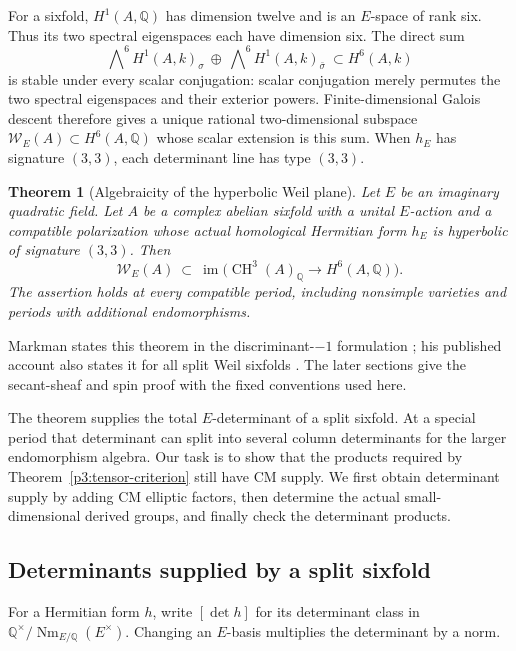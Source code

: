 \documentclass[11pt]{article}
\newcommand{\Q}{\mathbb Q}
\newcommand{\CH}{\operatorname{CH}}
\newtheorem{theorem}{Theorem}[section]
\numberwithin{equation}{section}
\begin{document}
For a sixfold, \(H^1(A,\Q)\) has dimension twelve and is an
\(E\)-space of rank six.  Thus its two spectral eigenspaces each
have dimension six.  The direct sum
\[
 \bigwedge\nolimits^6 H^1(A,k)_\sigma
 \ \oplus\
 \bigwedge\nolimits^6 H^1(A,k)_{\bar\sigma}
 \ \subset H^6(A,k)
\]
is stable under every scalar conjugation: scalar conjugation merely
permutes the two spectral eigenspaces and their exterior powers.
Finite-dimensional Galois descent therefore gives a unique rational
two-dimensional subspace \(\mathcal W_E(A)\subset H^6(A,\Q)\) whose
scalar extension is this sum.  When \(h_E\) has signature \((3,3)\),
each determinant line has type \((3,3)\).

\begin{theorem}[Algebraicity of the hyperbolic Weil plane]
\label{p3sw:weil-plane}
Let \(E\) be an imaginary quadratic field.  Let \(A\) be a complex
abelian sixfold with a unital \(E\)-action and a compatible polarization
whose actual homological Hermitian form \(h_E\) is hyperbolic of signature
\((3,3)\).  Then
\[
 \mathcal W_E(A)\ \subset\
 \operatorname{im}\bigl(\CH^3(A)_\Q
                    \longrightarrow H^6(A,\Q)\bigr).
\]
The assertion holds at every compatible period, including nonsimple
varieties and periods with additional endomorphisms.
\end{theorem}

Markman states this theorem in the discriminant-\(-1\) formulation
\cite[Theorem~1.5.1]{Markman2025Secant}; his published account also
states it for all split Weil sixfolds
\cite[Theorem~1.2]{Markman2026ICM}.  The later sections give the
secant-sheaf and spin proof with the fixed conventions used here.

The theorem supplies the total \(E\)-determinant of a split sixfold.
At a special period that determinant can split into several column
determinants for the larger endomorphism algebra.  Our task is to show
that the products required by Theorem~\ref{p3:tensor-criterion} still
have CM supply.  We first obtain determinant supply by adding CM
elliptic factors, then determine the actual small-dimensional derived
groups, and finally check the determinant products.

\subsection{Determinants supplied by a split sixfold}

For a Hermitian form \(h\), write \([\det h]\) for its determinant
class in \(\Q^\times/\operatorname{Nm}_{E/\Q}(E^\times)\).
Changing an \(E\)-basis multiplies the determinant by a norm.
\end{document}
